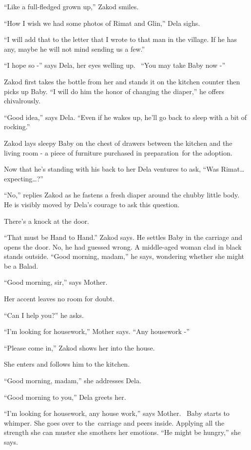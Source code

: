 \documentclass[twoside,11pt]{book}
\begin{document}
``Like a full-fledged grown up,'' Zakod smiles.

``How I wish we had some photos of Rimat and Glin,'' Dela sighs.

``I will add that to the letter that I wrote to that man in the village. If he has any, maybe he will not
mind sending us a few.''

``I hope so -'' says Dela, her eyes welling up. ~``You may take Baby now
-''

Zakod first takes the bottle from her and stands it on the kitchen counter then picks up Baby. ``I will do
him the honor of changing the diaper,'' he offers chivalrously.~

``Good idea,'' says Dela. ``Even if he wakes up, he'll go back to sleep with a
bit of rocking.''

Zakod lays sleepy Baby on the chest of drawers between the kitchen and the living room - a piece of furniture purchased
in preparation~for the adoption.

Now that he's standing with his back to her Dela ventures to ask, ``Was Rimat{\dots}
expecting{\dots}?''

``No,'' replies Zakod as he fastens a fresh diaper around the chubby little body.~ He is
visibly moved by Dela's courage to ask this question.

There's a knock at the door.

{}``That must be Hand to Hand.'' Zakod says. He settles Baby in the carriage and opens the door. No, he had
guessed wrong. A middle-aged{ }woman clad in black stands outside. ``Good morning,
madam,'' he says, wondering whether she might be a Balad.

``Good morning, sir,'' says Mother.

Her accent leaves no room for doubt.

``Can I help you?'' he asks.

``I'm looking for housework,'' Mother says. ``Any housework -''

``Please come in,'' Zakod shows her into the house.

She enters and follows him to the kitchen.

``Good morning, madam,'' she addresses Dela.

``Good morning to you,'' Dela greets her.

``I'm looking for housework, any house work,'' says Mother. \ Baby starts to whimper. She goes
over to the~carriage and peers inside. Applying all the strength she can muster she smothers her emotions.
``He might be hungry,'' she says.
\end{document}

